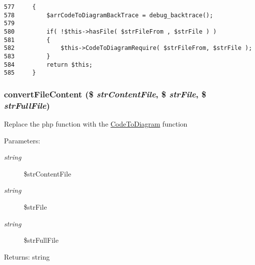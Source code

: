 \begin{Code}\begin{verbatim}577     {
578         $arrCodeToDiagramBackTrace = debug_backtrace();
579 
580         if( !$this->hasFile( $strFileFrom , $strFile ) )
581         {
582             $this->CodeToDiagramRequire( $strFileFrom, $strFile );
583         }
584         return $this;
585     }
\end{verbatim}
\end{Code}


\hypertarget{class_code_to_diagram_4ae436da9e8fe29b6ce2aa543212fa72}{
\subsubsection[{convertFileContent}]{\setlength{\rightskip}{0pt plus 5cm}convertFileContent (\$ {\em strContentFile}, \/  \$ {\em strFile}, \/  \$ {\em strFullFile})}}
\label{class_code_to_diagram_4ae436da9e8fe29b6ce2aa543212fa72}


Replace the php function with the \hyperlink{class_code_to_diagram}{CodeToDiagram} function

\begin{Desc}
\item[Parameters:]
\begin{description}
\item[{\em string}]\$strContentFile \item[{\em string}]\$strFile \item[{\em string}]\$strFullFile \end{description}
\end{Desc}
\begin{Desc}
\item[Returns:]string \end{Desc}


